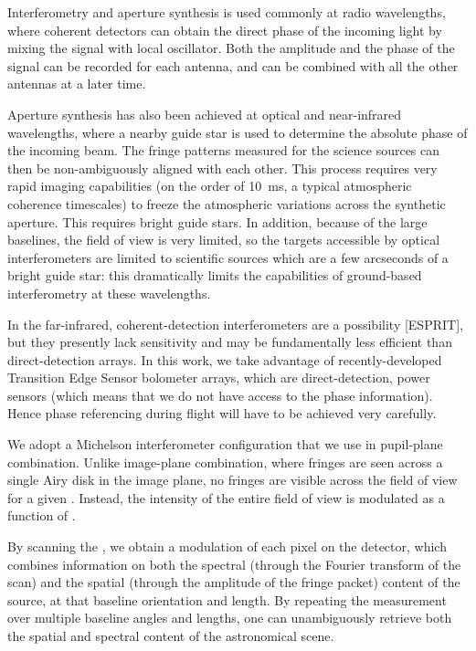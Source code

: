 Interferometry and aperture synthesis is used commonly at radio wavelengths, where coherent detectors can obtain the direct phase of the incoming light by mixing the signal with local oscillator. Both the amplitude and the phase of the signal can be recorded for each antenna, and can be combined with all the other antennas at a later time.

Aperture synthesis has also been achieved at optical and near-infrared wavelengths, where a nearby guide star is used to determine the absolute phase of the incoming beam. The fringe patterns measured for the science sources can then be non-ambiguously aligned with each other. This process requires very rapid imaging capabilities (on the order of \SI{10}{\milli\second}, a typical atmospheric coherence timescales) to freeze the atmospheric variations across the synthetic aperture. This requires bright guide stars. In addition, because of the large baselines, the field of view is very limited, so the targets accessible by optical interferometers are limited to scientific sources which are a few arcseconds of a bright guide star: this dramatically limits the capabilities of ground-based interferometry at these wavelengths.

In the far-infrared, coherent-detection interferometers are a possibility [ESPRIT], but they presently lack sensitivity and may be fundamentally less efficient than direct-detection arrays. In this work, we take advantage of recently-developed Transition Edge Sensor bolometer arrays, which are direct-detection, power sensors (which means that we do not have access to the phase information). Hence phase referencing during flight will have to be achieved very carefully.

We adopt a Michelson interferometer configuration that we use in pupil-plane combination. Unlike image-plane combination, where fringes are seen across a single Airy disk in the image plane, no fringes are visible across the field of view for a given \OPD. Instead, the intensity of the entire field of view is modulated as a function of \OPD. 

By scanning the \OPD, we obtain a modulation of each pixel on the detector, which combines information on both the spectral (through the Fourier transform of the scan) and the spatial (through the amplitude of the fringe packet) content of the source, at that baseline orientation and length. By repeating the measurement over multiple baseline angles and lengths, one can unambiguously retrieve both the spatial and spectral content of the astronomical scene. 

